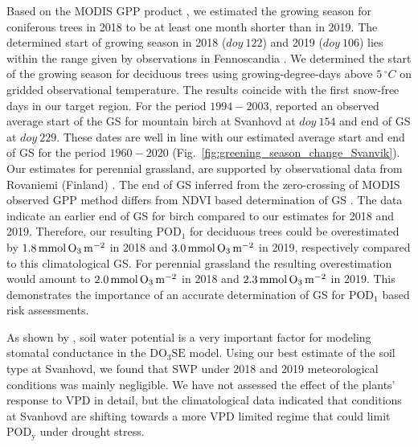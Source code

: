 \documentclass[bg, manuscript]{copernicus}
\begin{document}
Based on the MODIS GPP product \citep{MODIS_PSN}, we estimated the growing season for coniferous trees in 2018 to be at least one month shorter than in 2019. The determined start of growing season in 2018 ($\unit{doy}~122$) and 2019 ($\unit{doy}~106$) lies within the range given by observations in Fennoscandia \citep{TB:Kolari2007,IVL:Karlsson2018}. We determined the start of the growing season for deciduous trees using growing-degree-days above $5\,\unit{^\circ C}$ on gridded observational temperature. The results coincide with the first snow-free days in our target region.
For the period $1994-2003$, \citet{IJB:Shutova2006} reported an observed average start of the GS for mountain birch at Svanhovd at $\unit{doy}~154$ and end of GS at $\unit{doy}~229$. These dates are well in line with our estimated average start and end of GS for the period $1960-2020$ (Fig.~\ref{fig:greening_season_change_Svanvik}).
Our estimates for perennial grassland, are supported by observational data from Rovaniemi (Finland) \citep{FCR:Korhonen2018}. The end of GS inferred from the zero-crossing of MODIS observed GPP method differs from NDVI based determination of GS \citep{IGARSS:Hogda2001,IJB:Karlsen2007, RS:Hogda2013}.
The \citet{IJB:Shutova2006} data indicate an earlier end of GS for birch compared to our estimates for 2018 and 2019. Therefore, our resulting $\mathrm{POD_1}$ for deciduous trees could be overestimated by $1.8\,\unit{mmol\,\chem{O_3}\,m^{-2}}$ in 2018 and $3.0\,\unit{mmol\,\chem{O_3}\,m^{-2}}$ in 2019, respectively compared to this climatological GS. For perennial grassland the resulting overestimation would amount to $2.0\,\unit{mmol\,\chem{O_3}\,m^{-2}}$ in 2018 and $2.3\,\unit{mmol\,\chem{O_3}\,m^{-2}}$ in 2019. This demonstrates the importance of an accurate determination of GS for $\mathrm{POD_1}$ based risk assessments.

As shown by \citet{ACP:Bueker2012}, soil water potential is a very important factor for modeling stomatal conductance in the $\mathrm{DO_3SE}$ model. Using our best estimate of the soil type at Svanhovd, we found that SWP under 2018 and 2019 meteorological conditions was mainly negligible. We have not assessed the effect of the plants' response to VPD in detail, but the climatological data indicated that conditions at Svanhovd are shifting towards a more VPD limited regime that could limit $\mathrm{POD_y}$ under drought stress. 
\end{document}
